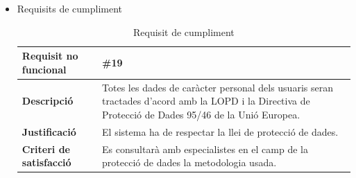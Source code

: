\begin{itemize}
\item{Requisits de cumpliment}

\begin{table}[!h]
\centering
\begin{tabular}{|l|M|}
\hline
\textbf{Requisit no funcional }& \#19  \\ \hline
\textbf{Descripció} & Totes les dades de caràcter personal dels usuaris seran tractades d’acord amb la LOPD i la Directiva de
Protecció de Dades 95/46 de la Unió Europea.\\ \hline
\textbf{Justificació} & El sistema ha de respectar la llei de protecció de dades. \\ \hline
\textbf{Criteri de satisfacció} & Es consultarà amb especialistes en el camp de la protecció de dades la metodologia usada.
\\ \hline
\end{tabular}
\label{}
\caption{Requisit de cumpliment}
\end{table}

\end{itemize}

